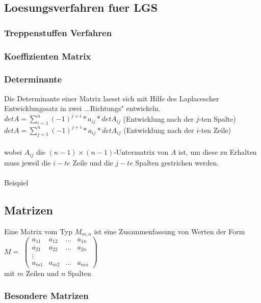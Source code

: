 \documentclass[a4paper]{article} %
\begin{document}
	\subsection{Loesungsverfahren fuer LGS}
	\subsubsection{Treppenstuffen Verfahren}
	\subsubsection{Koeffizienten Matrix}
	\pagebreak
	
	\subsubsection{Determinante} 
	Die Determinante einer Matrix laesst sich mit Hilfe des Laplacescher Entwicklungssatz in zwei ...Richtungs" entwickeln.\\
	$det A = \sum\limits_{i=1}^{n}(-1)^{j+i}*a_{ij}*detA_{ij} $ (Entwicklung nach der $j$-ten Spalte)\\
	$det A = \sum\limits_{j=1}^{n}(-1)^{j+i}*a_{ij}*detA_{ij} $ (Entwicklung nach der $i$-ten Zeile)\\\\
	wobei $A_{ij}$ die ${(n-1)} \times {(n-1)}$-Untermatrix von $A$ ist, um diese zu Erhalten muss jeweil die $i-te$ Zeile und die $j-te$ Spalten gestrichen werden.
	\\\\Beispiel
	\subsection{Matrizen}
	 \hspace{0 cm} 
	Eine Matrix vom Typ $M_{m,n}$ ist eine Zusammenfassung von Werten der Form $M =$
	$
	\begin{pmatrix}
		a_{11} & a_{12} & ... 	& a_{1n}\\
		a_{21} & a_{22} & ...		 & a_{2n}\\
	      \vdots    	&      &	    \\
		a_{m1} & a_{m2} & ...	& a_{mn}
	\end{pmatrix}
	$\\
	 mit $m$ Zeilen und $n$ Spalten
	\subsubsection{Besondere Matrizen}
\end{document}
